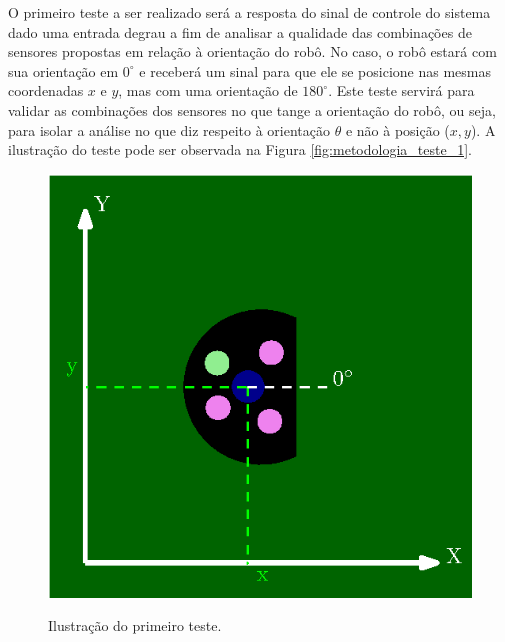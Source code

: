 \documentclass[acronym, symbols, table]{fei}
\begin{document}
		O primeiro teste a ser realizado será a resposta do sinal de controle do sistema dado uma entrada degrau a fim de analisar a qualidade das combinações de sensores propostas em relação à orientação do robô. No caso, o robô estará com sua orientação em $0^\circ$ e receberá um sinal para que ele se posicione nas mesmas coordenadas $x$ e $y$, mas com uma orientação de $180^\circ$. Este teste servirá para validar as combinações dos sensores no que tange a orientação do robô, ou seja, para isolar a análise no que diz respeito à orientação $\theta$ e não à posição ($x, y$). A ilustração do teste pode ser observada na Figura \ref{fig:metodologia_teste_1}.
		
		\begin{figure}[!htb]
			\caption{Ilustração do primeiro teste.}%
			\label{fig:metodologia_teste_1}
			\begin{minipage}{0.45\textwidth}
				\centering
				\includegraphics[width=\linewidth]{teste_1_0_graus.eps}
				\label{fig:metodologia_teste_1_a}
			\end{minipage}
			\hfill
			\begin{minipage}{0.45\textwidth}
				\centering

\end{minipage}
\end{figure}
\end{document}
